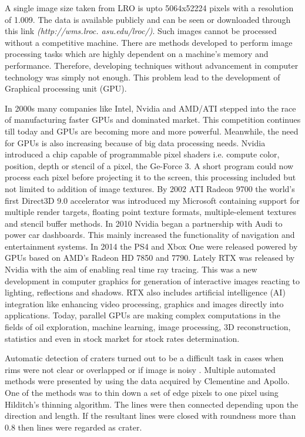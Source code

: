 \documentclass[11pt]{article}
\begin{document}
A single image size taken from LRO is upto 5064x52224 pixels with a resolution of 1.009. The data is available publicly and can be seen or downloaded through this link \textit{(http://wms.lroc.
	asu.edu/lroc/)}. 
Such images cannot be processed without a competitive machine. There are methods developed to perform image processing tasks which are highly dependent on a machine's memory and performance. Therefore, developing techniques without advancement in computer technology was simply not enough. This problem lead to the development of Graphical processing unit (GPU).

In 2000s many companies like Intel, Nvidia and AMD/ATI stepped into the race of manufacturing faster GPUs and dominated market. This competition continues till today and GPUs are becoming more and more powerful. Meanwhile, the need for GPUs is also increasing because of big data processing needs. Nvidia introduced a chip capable of programmable pixel shaders i.e. compute color, position, depth or stencil of a pixel, the Ge-Force 3. A short program could now process each pixel before projecting it to the screen, this processing included but not limited to addition of image textures. By 2002 ATI Radeon 9700 the world's first Direct3D 9.0 accelerator was introduced my Microsoft containing support for multiple render targets, floating point texture formats, multiple-element textures and stencil buffer methods. In 2010 Nvidia began a partnership with Audi to power car dashboards. This mainly increased the functionality of navigation and entertainment systems. In 2014 the PS4 and Xbox One were released powered by GPUs based on AMD's Radeon HD 7850 and 7790. Lately RTX was released by Nvidia with the aim of enabling real time ray tracing. This was a new development in computer graphics for generation of interactive images reacting to lighting, reflections and shadows. RTX also includes artificial intelligence (AI) integration like enhancing video processing, graphics and images directly into applications. Today, parallel GPUs are making complex computations in the fields of oil exploration, machine learning, image processing, 3D reconstruction, statistics and even in stock market for stock rates determination. 


Automatic detection of craters turned out to be a difficult task in cases when rims were not clear or overlapped or if image is noisy \cite{sawabe_2006}. Multiple automated methods were presented by \cite{sawabe_2006} using the data acquired by Clementine and Apollo. One of the methods was to thin down a set of edge pixels to one pixel using Hilditch's thinning algorithm. The lines were then connected depending upon the direction and length. If the resultant lines were closed with roundness more than 0.8 then lines were regarded as crater.
\end{document}
